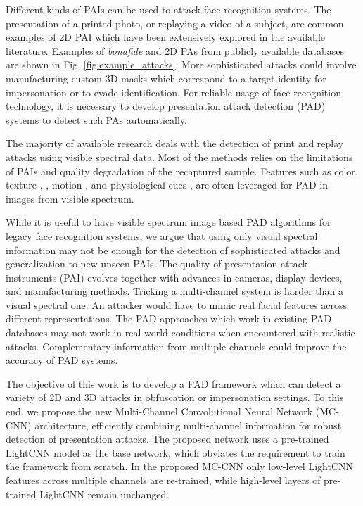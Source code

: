 \documentclass[journal]{IEEEtran}
\begin{document}
Different kinds of PAIs can be used to attack face recognition systems.
The presentation of a printed photo, or replaying a video of a subject, are common examples of 2D PAI which have been extensively explored in the available literature. Examples of \textit{bonafide} and 2D PAs
from publicly available databases are shown in Fig. \ref{fig:example_attacks}. More sophisticated attacks could involve manufacturing custom 3D masks which correspond to a target identity for impersonation or to evade identification. For reliable usage of face recognition technology, it is necessary to develop presentation attack detection (PAD) systems to detect such PAs automatically.

The majority of available research deals with the detection of print and replay attacks using visible spectral data. Most of the methods relies on the limitations of PAIs and quality degradation of the recaptured sample. Features such as color, texture \cite{boulkenafet2015face}, \cite{maatta2011face}, motion \cite{anjos2011counter}, and physiological cues \cite{ramachandra2017presentation}, \cite{heusch2019remote} are often leveraged for PAD in images from visible spectrum.


While it is useful to have visible spectrum image based PAD algorithms for legacy face recognition systems, we argue that using only visual spectral information may not be enough for the detection of sophisticated attacks and generalization to new unseen PAIs. The quality of presentation attack instruments (PAI) evolves together with advances in cameras, display devices, and manufacturing methods. Tricking a multi-channel system is harder than a visual spectral one. An attacker would have to mimic real facial features across different representations. The PAD approaches which work in existing PAD databases may not work in real-world conditions when encountered with realistic attacks. Complementary information from multiple channels could improve the accuracy of PAD systems.


The objective of this work is to develop a PAD framework which can detect a variety of 2D and 3D attacks in obfuscation or impersonation settings. To this end, we propose the new Multi-Channel Convolutional Neural Network (MC-CNN) architecture, efficiently combining multi-channel information for robust detection of presentation attacks. The proposed network uses a pre-trained LightCNN model as the base network, which obviates the requirement to train the framework from scratch. In the proposed MC-CNN only low-level LightCNN features across multiple channels are re-trained, while high-level layers of pre-trained LightCNN remain unchanged.
\end{document}
